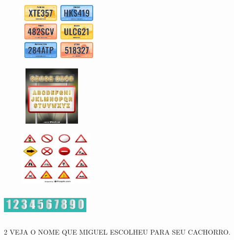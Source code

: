 \begin{escola}
{\begin{escolha}
\item \includegraphics[width=2.32569in,height=1.18472in]{media/image222.jpg}

\item \includegraphics[width=2.03125in,height=1.17361in]{media/image223.jpg}

\item \includegraphics[width=2.20764in,height=1.07569in]{media/image224.jpg}

\item \includegraphics[width=1.75000in,height=0.54792in]{media/image225.jpg}
\end{escolha}


\num{2} VEJA O NOME QUE MIGUEL ESCOLHEU PARA SEU CACHORRO.



}
\end{escola}
